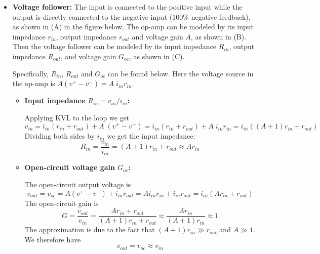 \documentclass{article}
\begin{document}
\begin{itemize}

\item {\bf Voltage follower:} The input is connected to the positive 
  input while the output is directly connected to the negative input 
  (100\% negative feedback), as shown in (A) in the figure below. The 
  op-amp can be modeled by its input impedance $r_{in}$, output impedance 
  $r_{out}$ and voltage gain $A$, as shown in (B). Then the voltage follower 
  can be modeled by its input impedance $R_{in}$, output impedance $R_{out}$,
  and voltage gain $G_{oc}$, as shown in (C). 

  
  Specifically, $R_{in}$, $R_{out}$ and $G_{oc}$ can be found below. Here 
  the voltage source in the op-amp is $A(v^+-v^-)=A \;i_{in} r_{in}$.
  
  \begin{itemize}
  \item {\bf Input impedance $R_{in}=v_{in}/i_{in}$:} 

    Applying KVL to the loop we get
    \begin{equation}
      v_{in}=i_{in}(r_{in}+r_{out})+A\;(v^+-v^-)
      =i_{in}(r_{in}+r_{out})+A\;i_{in}r_{in}
      =i_{in}((A+1)r_{in}+r_{out})
    \end{equation}
    Dividing both sides by $i_{in}$ we get the input impedance:
    \begin{equation}
      R_{in}=\frac{v_{in}}{i_{in}}=(A+1)r_{in}+r_{out} \approx Ar_{in}
    \end{equation}

  \item {\bf Open-circuit voltage gain $G_{oc}$:} 

    The open-circuit output voltage is
    \begin{equation}
      v_{out}=v_{oc}=A(v^+-v^-)+i_{in}r_{out}=Ai_{in}r_{in}+i_{in}r_{out}
      =i_{in}(Ar_{in}+r_{out})
    \end{equation}
    The open-circuit gain is
    \begin{equation}
      G=\frac{v_{out}}{v_{in}}=\frac{Ar_{in}+r_{out}}{(A+1)r_{in}+r_{out}}
      \approx \frac{Ar_{in}}{(A+1)r_{in}}\approx 1
    \end{equation}
    The approximation is due to the fact that $(A+1)r_{in}\gg r_{out}$
    and $A\gg 1$. We therefore have
    \begin{equation}
      v_{out}=v_{oc}\approx v_{in}
    \end{equation}


\end{itemize}
\end{itemize}
\end{document}
